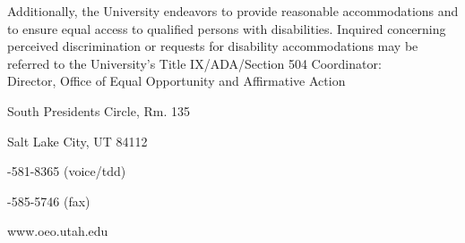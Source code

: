 \documentclass[12pt]{article}
\begin{document}
\noindent Additionally, the University endeavors to provide reasonable accommodations
and to ensure equal access to qualified persons with disabilities. Inquired concerning 
perceived discrimination or requests for disability accommodations may be referred to the 
University's Title IX/ADA/Section 504 Coordinator: \\

\noindent Director, Office of Equal Opportunity and Affirmative Action

 South Presidents Circle, Rm. 135

\noindent Salt Lake City, UT 84112

-581-8365 (voice/tdd)

-585-5746 (fax)

\noindent www.oeo.utah.edu
\end{document}

